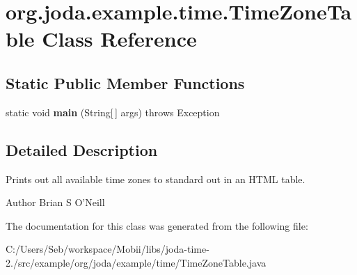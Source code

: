 \hypertarget{classorg_1_1joda_1_1example_1_1time_1_1_time_zone_table}{\section{org.\-joda.\-example.\-time.\-Time\-Zone\-Table Class Reference}
\label{classorg_1_1joda_1_1example_1_1time_1_1_time_zone_table}
}
\subsection*{Static Public Member Functions}
\begin{DoxyCompactItemize}
\item 
\hypertarget{classorg_1_1joda_1_1example_1_1time_1_1_time_zone_table_a2ce017688a14a4f2c64cf2c45f9e9e83}{static void {\bfseries main} (String\mbox{[}$\,$\mbox{]} args)  throws Exception }\label{classorg_1_1joda_1_1example_1_1time_1_1_time_zone_table_a2ce017688a14a4f2c64cf2c45f9e9e83}

\end{DoxyCompactItemize}


\subsection{Detailed Description}
Prints out all available time zones to standard out in an H\-T\-M\-L table.

\begin{DoxyAuthor}{Author}
Brian S O'Neill 
\end{DoxyAuthor}


The documentation for this class was generated from the following file\-:\begin{DoxyCompactItemize}
\item 
C\-:/\-Users/\-Seb/workspace/\-Mobii/libs/joda-\/time-\/2./src/example/org/joda/example/time/Time\-Zone\-Table.\-java\end{DoxyCompactItemize}
